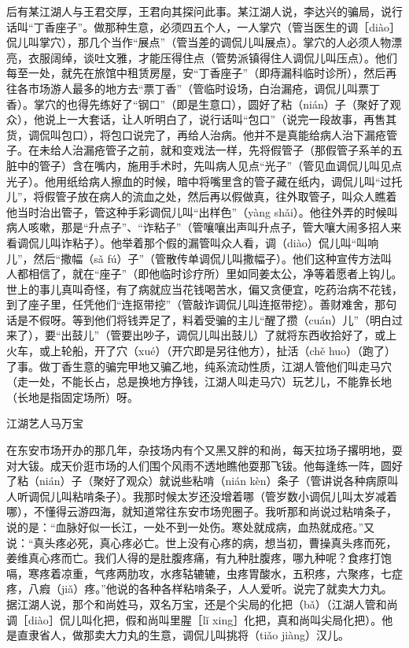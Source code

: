 \documentclass[12pt,UTF8]{ctexbook}
\begin{document}
后有某江湖人与王君交厚，王君向其探问此事。某江湖人说，李达兴的骗局，说行话叫“丁香座子”。做那种生意，必须四五个人，一人掌穴（管当医生的调［diào］侃儿叫掌穴），那几个当作“展点”（管当差的调侃儿叫展点）。掌穴的人必须人物漂亮，衣服阔绰，谈吐文雅，才能压得住点（管势派镇得住人调侃儿叫压点）。他们每至一处，就先在旅馆中租赁房屋，安“丁香座子”（即痔漏科临时诊所），然后再往各市场游人最多的地方去“票丁香”（管临时设场，白治漏疮，调侃儿叫票丁香）。掌穴的也得先练好了“钢口”（即是生意口），圆好了粘（nián）子（聚好了观众），他说上一大套话，让人听明白了，说行话叫“包口”（说完一段故事，再售其货，调侃叫包口），将包口说完了，再给人治病。他并不是真能给病人治下漏疮管子。在未给人治漏疮管子之前，就和变戏法一样，先将假管子（那假管子系羊的五脏中的管子）含在嘴内，施用手术时，先叫病人见点“光子”（管见血调侃儿叫见点光子）。他用纸给病人擦血的时候，暗中将嘴里含的管子藏在纸内，调侃儿叫“过托儿”，将假管子放在病人的流血之处，然后再以假做真，往外取管子，叫众人瞧着他当时治出管子，管这种手彩调侃儿叫“出样色”（yàng shǎi）。他往外弄的时候叫病人咳嗽，那是“升点子”、“诈粘子”（管嚷嚷出声叫升点子，管大嚷大闹多招人来看调侃儿叫诈粘子）。他举着那个假的漏管叫众人看，调（diào）侃儿叫“叫响儿”，然后“撒幅（sǎ fú）子”（管散传单调侃儿叫撒幅子）。他们这种宣传方法叫人都相信了，就在“座子”（即他临时诊疗所）里如同姜太公，净等着愿者上钩儿。世上的事儿真叫奇怪，有了病就应当花钱喝苦水，偏又贪便宜，吃药治病不花钱，到了座子里，任凭他们“连抠带挖”（管敲诈调侃儿叫连抠带挖）。善财难舍，那句话是不假呀。等到他们将钱弄足了，料着受骗的主儿“醒了攒（cuán）儿”（明白过来了），要“出鼓儿”（管要出吵子，调侃儿叫出鼓儿）了就将东西收拾好了，或上火车，或上轮船，开了穴（xué）（开穴即是另往他方），扯活（chě huo）（跑了）了事。做丁香生意的骗完甲地又骗乙地，纯系流动性质，江湖人管他们叫走马穴（走一处，不能长占，总是换地方挣钱，江湖人叫走马穴）玩艺儿，不能靠长地（长地是指固定场所）呀。





江湖艺人马万宝


在东安市场开办的那几年，杂技场内有个又黑又胖的和尚，每天拉场子撂明地，耍对大钹。成天价逛市场的人们围个风雨不透地瞧他耍那飞钹。他每逢练一阵，圆好了粘（nián）子（聚好了观众）就说些粘啃（nián kèn）条子（管讲说各种病原叫人听调侃儿叫粘啃条子）。我那时候太岁还没增着哪（管岁数小调侃儿叫太岁减着哪），不懂得云游四海，就知道常往东安市场兜圈子。我听那和尚说过粘啃条子，说的是：“血脉好似一长江，一处不到一处伤。寒处就成病，血热就成疮。”又说：“真头疼必死，真心疼必亡。世上没有心疼的病，想当初，曹操真头疼而死，姜维真心疼而亡。我们人得的是肚腹疼痛，有九种肚腹疼，哪九种呢？食疼打饱嗝，寒疼着凉重，气疼两肋攻，水疼轱辘辘，虫疼胃酸水，五积疼，六聚疼，七症疼，八瘕（jiǎ）疼。”他说的各种各样粘啃条子，人人爱听。说完了就卖大力丸。据江湖人说，那个和尚姓马，双名万宝，还是个尖局的化把（bǎ）（江湖人管和尚调［diào］侃儿叫化把，假和尚叫里腥［lǐ xing］化把，真和尚叫尖局化把）。他是直隶省人，做那卖大力丸的生意，调侃儿叫挑将（tiǎo jiàng）汉儿。
\end{document}

